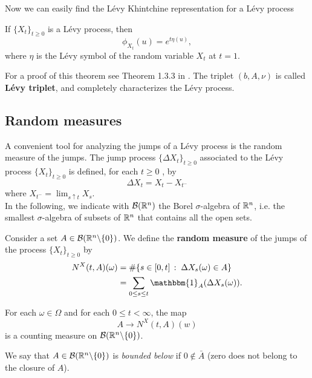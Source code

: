 Now we can easily find the Lévy Khintchine representation for a Lévy process
\begin{Theorem}
 If $\{X_t\}_{t \ge 0}$ is a Lévy process, then
 \begin{equation}\label{Levy_Kint}
  \phi_{X_t}(u) = e^{t \eta(u)},
 \end{equation}
where $\eta$ is the Lévy symbol of the random variable $X_t$ at $t=1$.
\end{Theorem}
For a proof of this theorem see Theorem 1.3.3 in \cite{Applebaum}.
The triplet $(b, A, \nu)$ is called \textbf{Lévy triplet}, and completely characterizes the Lévy process.

\subsection{Random measures}\label{random_measures}

A convenient tool for analyzing the jumps of a Lévy process is the random
measure of the jumps.
The jump process $\{\Delta X_t\}_{t \ge 0}$ associated to the Lévy process $\{X_t\}_{t \ge 0}$ is
defined, for each $t \geq 0$ , by
\begin{equation}\label{jump}
 \Delta X_t = X_t - X_{t^-}
\end{equation}
where $X_{t^-} = \lim_{s\uparrow t} X_s $.\\
In the following, we indicate with $\mathcal{B}(\mathbb{R}^n)$ 
the Borel $\sigma$-algebra of $\mathbb{R}^n$, i.e. the smallest $\sigma$-algebra of subsets of $\mathbb{R}^n$ that contains all the open sets.

\begin{Definition}
Consider a set $A \in \mathcal{B}(\mathbb{R}^n \backslash \{ 0 \})$.
We define the \textbf{random measure} of the jumps of the process $\{X_t\}_{t \ge 0}$ by
\begin{align}
 N^X(t,A)(\omega) &= \# \{ s \in [0,t] \, : \; \Delta X_s(\omega) \in A  \} \\
		   &= \sum_{0 \leq s \leq t} \mathbbm{1}_A(\Delta X_s(\omega)) . \nonumber
\end{align} 
\end{Definition}
For each $\omega \in \Omega$ and for each $0 \leq t < \infty$, the map 
$$ A \to N^X(t,A)(w) $$ 
is a counting measure on $\mathcal{B}(\mathbb{R}^n \backslash \{ 0 \})$. %

We say that $A\in \mathcal{B}(\mathbb{R}^n \backslash \{ 0 \})$ is \emph{bounded below} if $0 \not \in \bar A$ (zero does not belong to the closure of $A$). 

